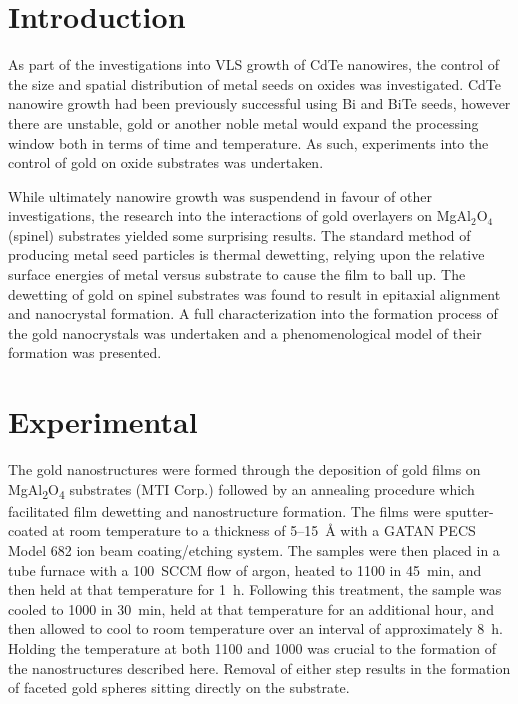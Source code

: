\section{Introduction} 
As part of the investigations into VLS growth of CdTe nanowires, the control of the size and spatial distribution of metal seeds on oxides was investigated.
CdTe nanowire growth had been previously successful using Bi and BiTe seeds, however there are unstable, gold or another noble metal would expand the processing window both in terms of time and temperature.
As such, experiments into the control of gold on oxide substrates was undertaken.

While ultimately nanowire growth was suspendend in favour of other investigations, the research into the interactions of gold overlayers on MgAl\(_2\)O\(_4\) (spinel) substrates yielded some surprising results.
The standard method of producing metal seed particles is thermal dewetting, relying upon the relative surface energies of metal versus substrate to cause the film to ball up.
The dewetting of gold on spinel substrates was found to result in epitaxial alignment and nanocrystal formation.
A full characterization into the formation process of the gold nanocrystals was undertaken and a phenomenological model of their formation was presented.

\section{Experimental}
The gold nanostructures were formed through the deposition of gold films on MgAl\textsubscript{2}O\textsubscript{4} substrates (MTI Corp.) followed by an annealing procedure which facilitated film dewetting and nanostructure formation.
The films were sputter-coated at room temperature to a thickness of 5--15~\AA{} with a GATAN PECS Model 682 ion beam coating/etching system.
The samples were then placed in a tube furnace with a 100~SCCM flow of argon, heated to 1100\celsius{} in 45~min, and then held at that temperature for 1~h.
Following this treatment, the sample was cooled to 1000\celsius{} in 30~min, held at that temperature for an additional hour, and then allowed to cool to room temperature over an interval of approximately 8~h.
Holding the temperature at both 1100 and 1000\celsius{} was crucial to the formation of the nanostructures described here.
Removal of either step results in the formation of faceted gold spheres sitting directly on the substrate.

